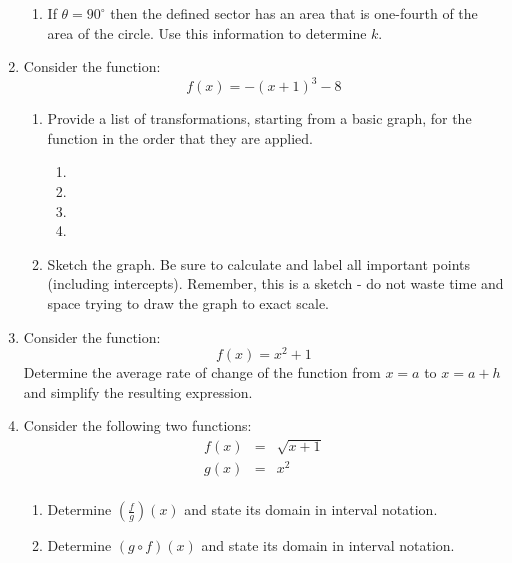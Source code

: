 \documentclass[letterpaper,12pt,fleqn]{article}
\begin{document}
\begin{enumerate}
\begin{enumerate}
\item If $\theta=90^{\circ}$ then the defined sector has an area that is
one-fourth of the area of the circle.  Use this information to determine $k$.
\end{enumerate}

\newpage

\item Consider the function:
\[f(x)=-(x+1)^3-8\]
\begin{enumerate}
\item Provide a list of transformations, starting from a basic graph, for the
function in the order that they are applied.
\begin{enumerate}
\item
\item
\item
\item
\end{enumerate}

\vspace{0.5in}

\item Sketch the graph. Be sure to calculate and label all important points
(including intercepts).  Remember, this is a sketch - do not waste time and
space trying to draw the graph to exact scale.
\end{enumerate}

\newpage

\item Consider the function:
\[f(x)=x^2+1\]
Determine the average rate of change of the function from $x=a$ to $x=a+h$ and
simplify the resulting expression.

\newpage

\item Consider the following two functions:
\begin{eqnarray*}
f(x) &=& \sqrt{x+1} \\
g(x) &=& x^2 \\
\end{eqnarray*}
\begin{enumerate}
\item Determine $\left(\frac{f}{g}\right)(x)$ and state its domain in interval
notation.

\vspace{3.0in}

\item Determine $(g\circ f)(x)$ and state its domain in interval notation.
\end{enumerate}


\end{enumerate}
\end{document}
